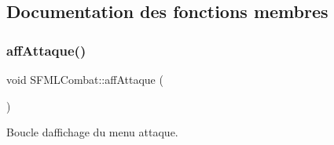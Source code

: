\subsection{Documentation des fonctions membres}
\mbox{\label{class_s_f_m_l_combat_a8803b5fb491ebcba31787b0aa20a9c07}} 
\subsubsection{\texorpdfstring{aff\+Attaque()}{affAttaque()}}
{\footnotesize\ttfamily void S\+F\+M\+L\+Combat\+::aff\+Attaque (\begin{DoxyParamCaption}{ }\end{DoxyParamCaption})\hspace{0.3cm}{\ttfamily [private]}}



Boucle d\textquotesingle{}affichage du menu attaque. 

